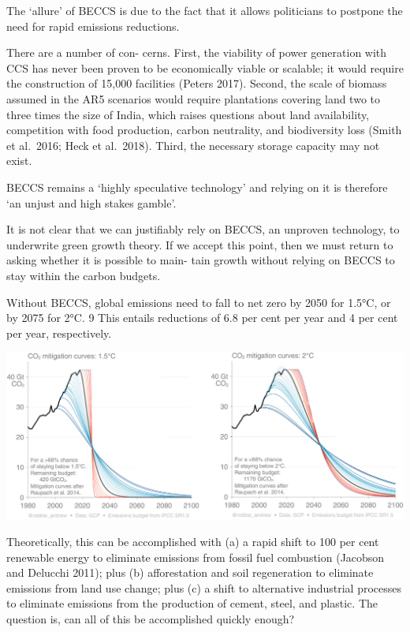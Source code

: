 \documentclass[
]{book}
\begin{document}
The `allure' of BECCS is due to the fact that it allows
politicians to postpone the need for rapid emissions reductions.

There are a number of con-
cerns. First, the viability of power generation with CCS has never been proven to be economically
viable or scalable; it would require the construction of 15,000 facilities (Peters 2017). Second, the
scale of biomass assumed in the AR5 scenarios would require plantations covering land two to
three times the size of India, which raises questions about land availability, competition with food
production, carbon neutrality, and biodiversity loss (Smith et al.~2016; Heck et al.~2018). Third, the
necessary storage capacity may not exist.

BECCS remains a `highly speculative technology'
and relying on it is therefore `an unjust and high stakes gamble'.

It is not clear that we can justifiably rely on BECCS, an unproven technology, to underwrite green
growth theory. If we accept this point, then we must return to asking whether it is possible to main-
tain growth without relying on BECCS to stay within the carbon budgets.

Without BECCS, global emissions need to fall to net zero by 2050 for 1.5°C, or by 2075
for 2°C. 9 This entails reductions of 6.8 per cent per year and 4 per cent per year, respectively.

\includegraphics{fig/Hickel_Carbon_Budget.png}

Theoretically, this can be accomplished with (a) a rapid shift to 100 per cent renewable
energy to eliminate emissions from fossil fuel combustion (Jacobson and Delucchi 2011); plus (b)
afforestation and soil regeneration to eliminate emissions from land use change; plus (c) a shift to
alternative industrial processes to eliminate emissions from the production of cement, steel, and
plastic. The question is, can all of this be accomplished quickly enough?
\end{document}
